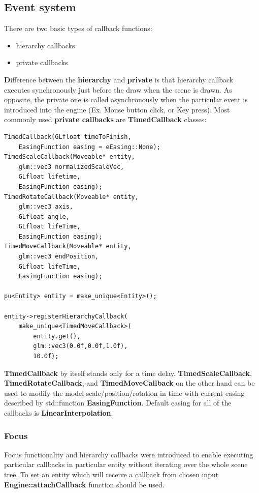 \documentclass{article}
\begin{document}
\newpage
\subsection{Event system}\label{sec:Event system}
\indent \indent There are two basic types of callback functions:
\begin{itemize}
\item hierarchy callbacks
\item private callbacks
\end{itemize}

\indent \indent \textbf Difference between the \textbf{hierarchy} and \textbf{private} is that hierarchy callback executes synchronously just before the draw when the scene is drawn. As opposite, the private one is called asynchronously when the particular event is introduced into the engine (Ex. Mouse button click, or Key press). Most commonly used \textbf{private callbacks} are \textbf{TimedCallback} classes:

\begin{lstlisting}
TimedCallback(GLfloat timeToFinish,
	EasingFunction easing = eEasing::None);
TimedScaleCallback(Moveable* entity,
	glm::vec3 normalizedScaleVec,
	GLfloat lifetime,
	EasingFunction easing);
TimedRotateCallback(Moveable* entity,
	glm::vec3 axis,
	GLfloat angle,
	GLfloat lifeTime,
	EasingFunction easing);
TimedMoveCallback(Moveable* entity,
	glm::vec3 endPosition,
	GLfloat lifeTime,
	EasingFunction easing);
                  
pu<Entity> entity = make_unique<Entity>();

entity->registerHierarchyCallback(
	make_unique<TimedMoveCallback>(
		entity.get(),
		glm::vec3(0.0f,0.0f,1.0f),
		10.0f);
\end{lstlisting}

\indent \indent \textbf{TimedCallback} by itself stands only for a time delay. \textbf{TimedScaleCallback}, \textbf{TimedRotateCallback}, and \textbf{TimedMoveCallback} on the other hand can be used to modify the model scale/position/rotation in time with current easing described by std::function \textbf{EasingFunction}. Default easing for all of the callbacks is \textbf{LinearInterpolation}.
\newpage

\subsubsection{Focus}\label{sec:Focus}
\indent \indent Focus functionality and hierarchy callbacks were introduced to enable executing particular callbacks in particular entity without iterating over the whole scene tree. To set an entity which will receive a callback from chosen input \textbf{Engine::attachCallback} function should be used.
\newline
\end{document}
